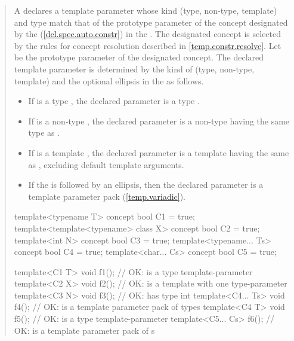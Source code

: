\begin{quote}
\begin{addedblock}
\setcounter{Paras}{8}
\pnum
A  declares a template parameter whose 
kind (type, non-type, template) and type match that of the prototype parameter 
of the concept designated by the  
(\ref{dcl.spec.auto.constr}) in the .
% 
The designated concept is selected by the rules for concept resolution 
described in \ref{temp.constr.resolve}.
% 
Let  be the prototype parameter of the designated concept.
% 
The declared template parameter is determined by the kind of  
(type, non-type, template) and the optional ellipsis in the
 as follows.
% 
\begin{itemize}
\item If  is a type , the declared
parameter is a type . 

\item If  is a non-type , the declared
parameter is a non-type  having the same 
type as .

\item If  is a template , the declared
parameter is a template  having the same 
 as , excluding default template 
arguments.

\item If the  is followed by an ellipsis,
then the declared parameter is a template parameter pack (\ref{temp.variadic}).
\end{itemize}
% 
\enterexample
\begin{codeblock}
template<typename T> concept bool C1 = true;
template<template<typename> class X> concept bool C2 = true;
template<int N> concept bool C3 = true;
template<typename... Ts> concept bool C4 = true;
template<char... Cs> concept bool C5 = true;

template<C1 T> void f1();     // OK:  is a type template-parameter
template<C2 X> void f2();     // OK:  is a template with one type-parameter
template<C3 N> void f3();     // OK:  has type int
template<C4... Ts> void f4(); // OK:  is a template parameter pack of types
template<C4 T> void f5();     // OK:  is a type template-parameter
template<C5... Cs> f6();      // OK:  is a template parameter pack of s
\end{codeblock}
\exitexample


\end{addedblock}
\end{quote}
